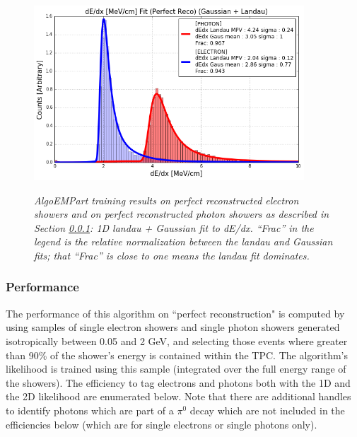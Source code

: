 \begin{figure}[ht!]
\centering
\includegraphics[width=0.9\textwidth]{Figures/EMPartTraining/mc_trained/dEdx_Selected_both.png}\\
\caption{\textit{AlgoEMPart training results on perfect reconstructed electron showers and on perfect reconstructed photon showers as described in Section \ref{empart_perfectreco_performance}: 1D landau + Gaussian fit to dE/dx. ``Frac'' in the legend is the relative normalization between the landau and Gaussian fits; that ``Frac'' is close to one means the landau fit dominates.}}
\label{empart_perfectreco_performance_fig2}
\end{figure}






\subsubsection{Performance}\label{empart_perfectreco_performance}
The performance of this algorithm on ``perfect reconstruction" is computed by using samples of single electron showers and single photon showers generated isotropically between 0.05 and 2 GeV, and selecting those events where greater than 90\% of the shower's energy is contained within the TPC. The algorithm's likelihood is trained using this sample (integrated over the full energy range of the showers). The efficiency to tag electrons and photons both with the 1D and the 2D likelihood are enumerated below. Note that there are additional handles to identify photons which are part of a $\pi^0$ decay which are not included in the efficiencies below (which are for single electrons or single photons only).

